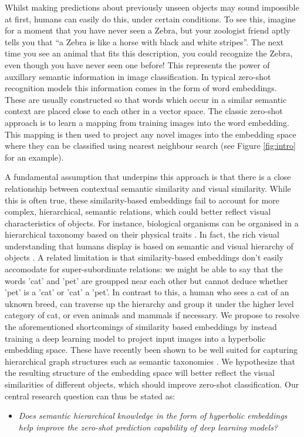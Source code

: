 \documentclass[12pt]{report}
\begin{document}
Whilst making predictions about previously unseen objects may sound impossible at first, humans can easily do this, under certain conditions. To see this, imagine for a moment that you have never seen a Zebra, but your zoologist friend aptly tells you that ``a Zebra is like a horse with black and white stripes''. The next time you see an animal that fits this description, you could recognize the Zebra, even though you have never seen one before! This represents the power of auxillary semantic information in image classification. In typical zero-shot recognition models this information comes in the form of word embeddings. These are usually constructed so that words which occur in a similar semantic context are placed close to each other in a vector space. The classic zero-shot approach is to learn a mapping from training images into the word embedding. This mapping is then used to project any novel images into the embedding space where they can be classified using nearest neighbour search (see Figure \ref{fig:intro} for an example). 

A fundamental assumption that underpins this approach is that there is a close relationship between contextual semantic similarity and visual similarity. While this is often true, these similarity-based embeddings fail to account for more complex, hierarchical, semantic relations, which could better reflect visual characteristics of objects. For instance, biological organisms can be organised in a hierarchical taxonomy based on their physical traits \cite{Ohl2015}. In fact, the rich visual understanding that humans display is based on semantic and visual hierarchy of objects \cite{Joliceur1984}. A related limitation is that similarity-based embeddings don't easily accomodate for super-subordinate relations: we might be able to say that the words 'cat' and 'pet' are groupped near each other but cannot deduce whether 'pet' is a 'cat' or 'cat' a 'pet'. In contrast to this, a human who sees a cat of an uknown breed, can traverse up the hierarchy and group it under the higher level category of cat, or even animals and mammals if necessary. 
We propose to resolve the aforementioned shortcomings of similarity based embeddings by instead training a deep learning model to project input images into a hyperbolic embedding space. These have recently been shown to be well suited for capturing hierarchical graph structures such as semantic taxonomies \cite{Nickel2017, Chamberlain2017}. We hypothesize that the resulting structure of the embedding space will better reflect the visual similarities of different objects, which should improve zero-shot classification. Our central research question can thus be stated as: 
\begin{itemize}
  \item \textit{Does semantic hierarchical knowledge in the form of hyperbolic embeddings help improve the zero-shot prediction capability of deep learning models?}
\end{itemize}
\end{document}
